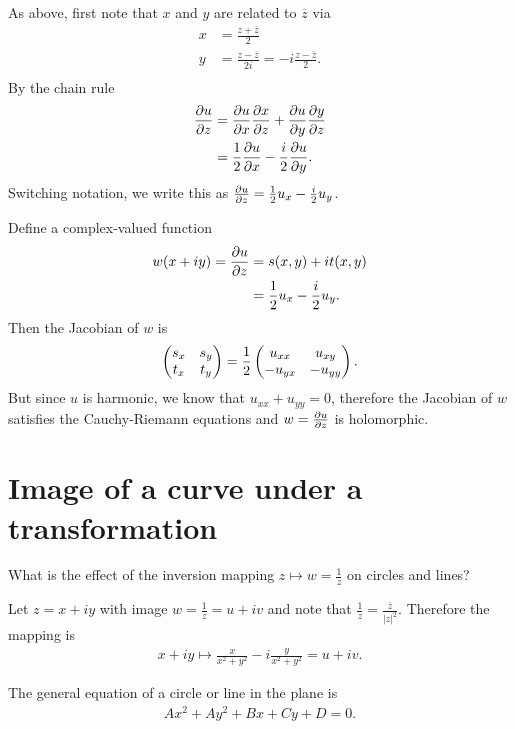 \documentclass[12pt]{article}
\renewcommand{\bar}{\overline}
\begin{document}
\begin{description}
As above, first note that $x$ and $y$ are related to $\bar z$ via
\begin{align*}
x &= \frac{z + \bar z}{2} \\
y &= \frac{z - \bar z}{2i} = -i\frac{z - \bar z}{2}. \\
\end{align*}
By the chain rule
\begin{align*}
\frac{\partial u}{\partial z}
&= \frac{\partial u}{\partial x} \frac{\partial x}{\partial z} + \frac{\partial u}{\partial y} \frac{\partial y}{\partial z} \\
&= \frac{1}{2} \frac{\partial u}{\partial x}  - \frac{i}{2} \frac{\partial u}{\partial y}. \\
\end{align*}
Switching notation, we write this as $\frac{\partial u}{\partial z} = \frac{1}{2} u_x  - \frac{i}{2} u_y$.

Define a complex-valued function
\begin{align*}
w(x + iy)
= \frac{\partial u}{\partial z} &= s(x,y) + it(x,y) \\
&= \frac{1}{2} u_x  - \frac{i}{2} u_y.
\end{align*}
Then the Jacobian of $w$ is
\begin{align*}
\begin{pmatrix}s_x & s_y\\t_x & t_y\\ \end{pmatrix} = \frac{1}{2}\begin{pmatrix}u_{xx} & u_{xy}\\-u_{yx} & -u_{yy}\\ \end{pmatrix}.
\end{align*}
But since $u$ is harmonic, we know that $u_{xx} + u_{yy} = 0$, therefore the
Jacobian of $w$ satisfies the Cauchy-Riemann equations and $w = \frac{\partial u}{\partial z}$ is
holomorphic.

\end{description}

\section*{Image of a curve under a transformation}
What is the effect of the inversion mapping $z \mapsto w = \frac{1}{z}$ on circles
and lines?

Let $z = x + iy$ with image $w = \frac{1}{z} = u + iv$ and note that
$\frac{1}{z} = \frac{\bar z}{|z|^2}$. Therefore the mapping is
\begin{align*}
  x + iy \mapsto \frac{x}{x^2 + y^2} - i\frac{y}{x^2 + y^2} = u + iv.
\end{align*}

The general equation of a circle or line in the plane is
\begin{align*}
  Ax^2 + Ay^2 + Bx + Cy + D  = 0.
\end{align*}
\end{document}
